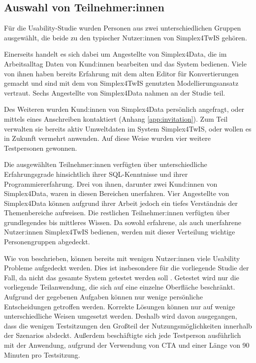 \subsection{Auswahl von Teilnehmer:innen}

Für die Usability-Studie wurden Personen aus zwei unterschiedlichen Gruppen ausgewählt, die beide zu den typischer Nutzer:innen von Simplex4TwIS gehören.

Einerseits handelt es sich dabei um Angestellte von Simplex4Data, die im Arbeitsalltag Daten von Kund:innen bearbeiten und das System bedienen. Viele von ihnen haben bereits Erfahrung mit dem alten Editor für Konvertierungen gemacht und sind mit dem von Simplex4TwIS genutzten Modellierungsansatz vertraut. Sechs Angestellte von Simplex4Data nahmen an der Studie teil.

Des Weiteren wurden Kund:innen von Simplex4Data persönlich angefragt, oder mittels eines Anschreiben kontaktiert (Anhang \ref{app:invitation}). Zum Teil verwalten sie bereits aktiv Umweltdaten im System Simplex4TwIS, oder wollen es in Zukunft vermehrt anwenden. Auf diese Weise wurden vier weitere Testpersonen gewonnen.

Die ausgewählten Teilnehmer:innen verfügten über unterschiedliche Erfahrungsgrade hinsichtlich ihrer SQL-Kenntnisse und ihrer Programmiererfahrung. Drei von ihnen, darunter zwei Kund:innen von Simplex4Data, waren in diesen Bereichen unerfahren. Vier Angestellte von Simplex4Data können aufgrund ihrer Arbeit jedoch ein tiefes Verständnis der Themenbereiche aufweisen. Die restlichen Teilnehmer:innen verfügten über grundlegendes bis mittleres Wissen. Da sowohl erfahrene, als auch unerfahrene Nutzer:innen Simplex4TwIS bedienen, werden mit dieser Verteilung wichtige Personengruppen abgedeckt.

Wie von \textcite{nielsenWhyYou2000} beschrieben, können bereits mit wenigen Nutzer:innen viele Usability Probleme aufgedeckt werden. Dies ist insbesondere für die vorliegende Studie der Fall, da nicht das gesamte System getestet werden soll \parencite[Vgl. \ref{sec:formative-summative}]{spoolTestingWeb2001}. Getestet wird nur die vorliegende Teilanwendung, die sich auf eine einzelne Oberfläche beschränkt. Aufgrund der gegebenen Aufgaben können nur wenige persönliche Entscheidungen getroffen werden. Korrekte Lösungen können nur auf wenige unterschiedliche Weisen umgesetzt werden. Deshalb wird davon ausgegangen, dass die wenigen Testsitzungen den Großteil der Nutzungsmöglichkeiten innerhalb der Szenarios abdeckt. Außerdem beschäftigte sich jede Testperson ausführlich mit der Anwendung, aufgrund der Verwendung von \ac{CTA} und einer Länge von 90 Minuten pro Testsitzung.

